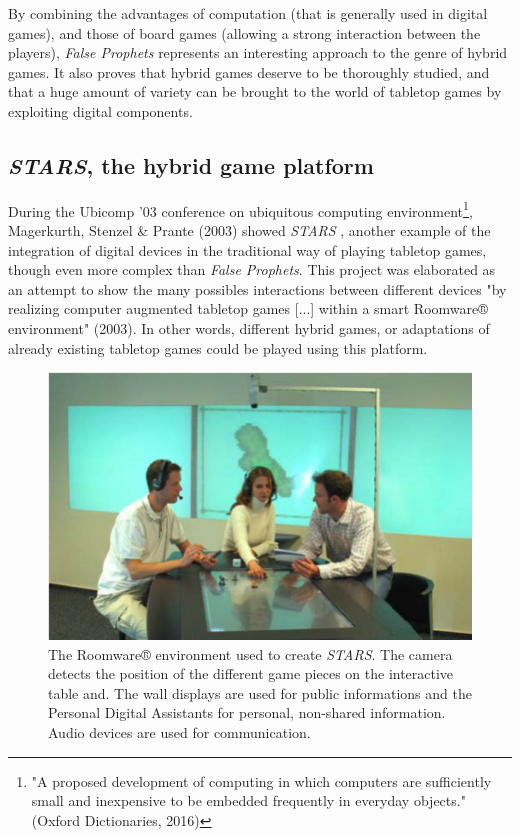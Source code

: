 By combining the advantages of computation (that is generally used in digital games), and those of board games (allowing a strong interaction between the players), \textit{False Prophets} represents an interesting approach to the genre of hybrid games. It also proves that hybrid games deserve to be thoroughly studied, and that a huge amount of variety can be brought to the world of tabletop games by exploiting digital components.
\subsection{\textit{STARS}, the hybrid game platform}
During the Ubicomp '03 conference on ubiquitous computing environment\footnote{"A proposed development of computing in which computers are sufficiently small and inexpensive to be embedded frequently in everyday objects."(Oxford Dictionaries, 2016)}, Magerkurth, Stenzel \& Prante (2003) showed \textit{STARS} \cite{art:stars}, another example of the integration of digital devices in the traditional way of playing tabletop games, though even more complex than \textit{False Prophets}. This project was elaborated as an attempt to show the many possibles interactions between different devices "by realizing computer augmented tabletop games [...] within a smart Roomware® environment" (2003)\cite{art:stars}. In other words, different hybrid games, or adaptations of already existing tabletop games could be played using this platform.
\begin{figure}[h]
    \centering
    \includegraphics[scale=0.4]{Images/roomware.png}
    \caption{The Roomware® environment used to create \textit{STARS}. The camera detects the position of the different game pieces on the interactive table and. The wall displays are used for public informations and the Personal Digital Assistants for personal, non-shared information. Audio devices are used for communication.}
    \label{fig:roomware}
\end{figure}
